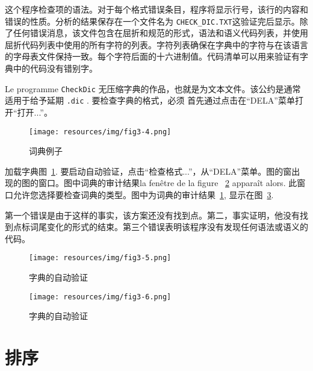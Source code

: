 \bigskip
\noindent 这个程序检查项的语法。对于每个格式错误条目，程序将显示行号，该行的内容和错误的性质。分析的结果保存在一个文件名为
\verb+CHECK_DIC.TXT+这验证完后显示。除了任何错误消息，该文件包含在屈折和规范的形式，语法和语义代码列表，并使用屈折代码列表中使用的所有字符的列表。字符列表确保在字典中的字符与在该语言的字母表文件保持一致。每个字符后面的十六进制值。代码清单可以用来验证有字典中的代码没有错别字。


\bigskip
\noindent Le programme \verb+CheckDic+ 无压缩字典的作品，也就是为文本文件。该公约是通常适用于给予延期
\verb+.dic+ . 要检查字典的格式，必须
首先通过点击在“DELA”菜单打开“打开...”。

\begin{figure}[h]
\begin{center}
\texttt{[image: resources/img/fig3-4.png]}
\caption{词典例子\label{fig-dictionary-example}}
\end{center}
\end{figure}

\noindent 加载字典图~\ref{fig-dictionary-example}.
要启动自动验证，点击“检查格式...”，从“DELA”菜单。图的窗出现的图的窗口。图中词典的审计结果la fenêtre de la figure ~\ref{fig-dictionary-checking} apparaît alors.
此窗口允许您选择要检查词典的类型。图中为词典的审计结果~\ref{fig-dictionary-example},
显示在图~\ref{fig-dictionary-checking-results}.

\bigskip
\noindent 第一个错误是由于这样的事实，该方案还没有找到点。第二，事实证明，他没有找到点标词尾变化的形式的结束。第三个错误表明该程序没有发现任何语法或语义的代码。




\begin{figure}[!h]
\begin{center}
\texttt{[image: resources/img/fig3-5.png]}
\caption{字典的自动验证\label{fig-dictionary-checking}}
\end{center}
\end{figure}

\begin{figure}[!p]
\begin{center}
\texttt{[image: resources/img/fig3-6.png]}
\caption{字典的自动验证\label{fig-dictionary-checking-results}}
\end{center}
\end{figure}


\section{排序}

